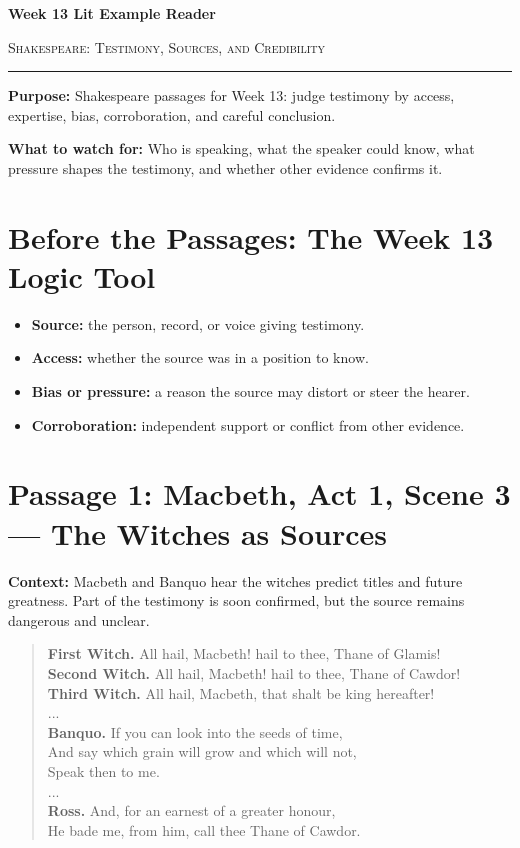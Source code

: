 \documentclass[12pt]{article}
\newenvironment{playpassage}{\begin{quote}\footnotesize\setlength{\parskip}{0.08em}\setlength{\parindent}{0pt}}{\end{quote}}
\newcommand{\speaker}[1]{\textbf{#1.}}
\begin{document}
\begin{center}
{\LARGE\bfseries Week 13 Lit Example Reader}\par\vspace{0.02em}
{\large\scshape Shakespeare: Testimony, Sources, and Credibility}\par\vspace{0.06em}
\rule{0.78\textwidth}{0.5pt}
\end{center}

\textbf{Purpose:} Shakespeare passages for Week 13: judge testimony by access, expertise, bias, corroboration, and careful conclusion.

\textbf{What to watch for:} Who is speaking, what the speaker could know, what pressure shapes the testimony, and whether other evidence confirms it.

\section*{Before the Passages: The Week 13 Logic Tool}

\begin{itemize}[leftmargin=1.3em,itemsep=0.05em,topsep=0.08em,parsep=0.03em]
\item \textbf{Source:} the person, record, or voice giving testimony.
\item \textbf{Access:} whether the source was in a position to know.
\item \textbf{Bias or pressure:} a reason the source may distort or steer the hearer.
\item \textbf{Corroboration:} independent support or conflict from other evidence.
\end{itemize}

\section*{Passage 1: Macbeth, Act 1, Scene 3 --- The Witches as Sources}

\textbf{Context:} Macbeth and Banquo hear the witches predict titles and future greatness. Part of the testimony is soon confirmed, but the source remains dangerous and unclear.

\begin{playpassage}
\speaker{First Witch} All hail, Macbeth! hail to thee, Thane of Glamis!\\
\speaker{Second Witch} All hail, Macbeth! hail to thee, Thane of Cawdor!\\
\speaker{Third Witch} All hail, Macbeth, that shalt be king hereafter!\\
...\\
\speaker{Banquo} If you can look into the seeds of time,\\
And say which grain will grow and which will not,\\
Speak then to me.\\
...\\
\speaker{Ross} And, for an earnest of a greater honour,\\
He bade me, from him, call thee Thane of Cawdor.
\end{playpassage}
\end{document}
